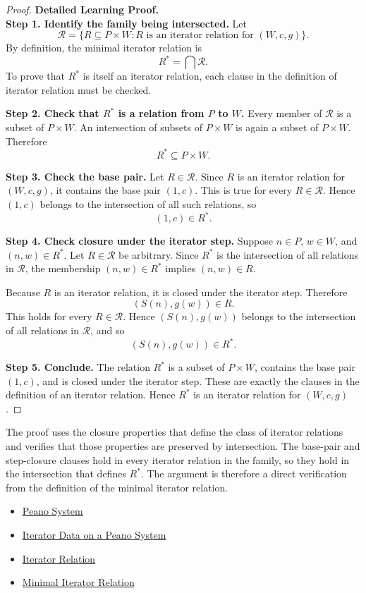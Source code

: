 \begin{proof}
\textbf{Detailed Learning Proof.}~\\

\textbf{Step 1. Identify the family being intersected.}
Let
\[
\mathcal R=
\{R\subseteq P\times W : R \text{ is an iterator relation for } (W,c,g)\}.
\]
By definition, the minimal iterator relation is
\[
R^*=\bigcap \mathcal R.
\]
To prove that $R^*$ is itself an iterator relation, each clause in the
definition of iterator relation must be checked.

\textbf{Step 2. Check that $R^*$ is a relation from $P$ to $W$.}
Every member of $\mathcal R$ is a subset of $P\times W$. An intersection of
subsets of $P\times W$ is again a subset of $P\times W$. Therefore
\[
R^*\subseteq P\times W.
\]

\textbf{Step 3. Check the base pair.}
Let $R\in\mathcal R$. Since $R$ is an iterator relation for $(W,c,g)$, it
contains the base pair $(1,c)$. This is true for every $R\in\mathcal R$.
Hence $(1,c)$ belongs to the intersection of all such relations, so
\[
(1,c)\in R^*.
\]

\textbf{Step 4. Check closure under the iterator step.}
Suppose $n\in P$, $w\in W$, and $(n,w)\in R^*$. Let $R\in\mathcal R$ be
arbitrary. Since $R^*$ is the intersection of all relations in $\mathcal R$,
the membership $(n,w)\in R^*$ implies $(n,w)\in R$.

Because $R$ is an iterator relation, it is closed under the iterator step.
Therefore
\[
(S(n),g(w))\in R.
\]
This holds for every $R\in\mathcal R$. Hence $(S(n),g(w))$ belongs to the
intersection of all relations in $\mathcal R$, and so
\[
(S(n),g(w))\in R^*.
\]

\textbf{Step 5. Conclude.}
The relation $R^*$ is a subset of $P\times W$, contains the base pair
$(1,c)$, and is closed under the iterator step. These are exactly the clauses
in the definition of an iterator relation. Hence $R^*$ is an iterator relation
for $(W,c,g)$.
\end{proof}

\begin{remark*}
The proof uses the closure properties that define the class of iterator
relations and verifies that those properties are preserved by intersection.
The base-pair and step-closure clauses hold in every iterator relation in the
family, so they hold in the intersection that defines $R^*$. The argument is
therefore a direct verification from the definition of the minimal iterator
relation.
\end{remark*}

\begin{dependencies}
\begin{itemize}
  \item \hyperref[def:peano-system]{Peano System}
  \item \hyperref[def:iterator-data-on-peano-system]{Iterator Data on a Peano System}
  \item \hyperref[def:iterator-relation]{Iterator Relation}
  \item \hyperref[def:minimal-iterator-relation]{Minimal Iterator Relation}
\end{itemize}
\end{dependencies}

\clearpage
